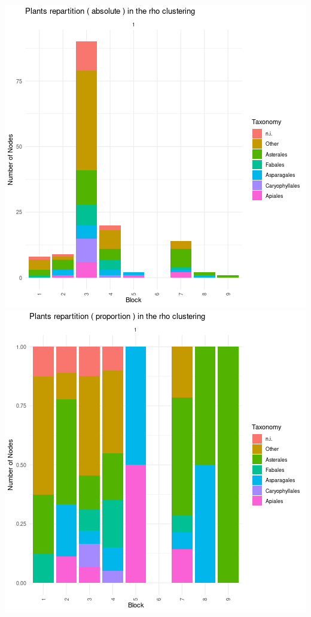 \includegraphics{./img/d1f52d1df28195df25bdfd2bf18f50a176d52c90.png}\includegraphics{./img/ce6571ff09f37636eff0631a2269c77055df1403.png}

